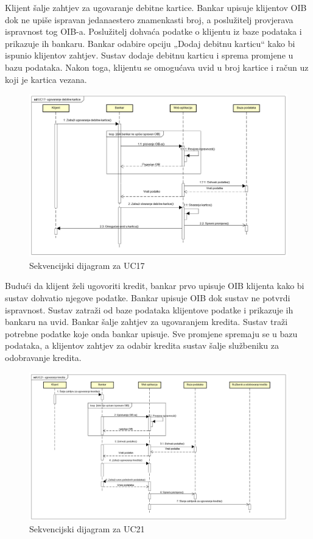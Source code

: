 			Klijent šalje zahtjev za ugovaranje debitne kartice. Bankar upisuje klijentov OIB dok ne upiše ispravan jedanaestero znamenkasti broj, a poslužitelj provjerava ispravnost tog OIB-a. Poslužitelj dohvaća podatke o klijentu iz baze podataka i prikazuje ih bankaru. Bankar odabire opciju „Dodaj debitnu karticu“ kako bi ispunio klijentov zahtjev. Sustav dodaje debitnu karticu i sprema promjene u bazu podataka. Nakon toga, klijentu se omogućava uvid u broj kartice i račun uz koji je kartica vezana.
			\eject
			
			\begin{figure}[H]
				\includegraphics[scale=0.50]{slike/UC17- ugovaranje debitne kartice1.PNG}
				\centering
				\caption{Sekvencijski dijagram za UC17}
				\label{fig:uc17}
			\end{figure}
			\eject
			
			
			
			Budući da klijent želi ugovoriti kredit, bankar prvo upisuje OIB klijenta kako bi sustav dohvatio njegove podatke. Bankar upisuje OIB dok sustav ne potvrdi ispravnost. Sustav zatraži od baze podataka klijentove podatke i prikazuje ih bankaru na uvid. Bankar šalje zahtjev za ugovaranjem kredita. Sustav traži potrebne podatke koje onda bankar upisuje. Sve promjene spremaju se u bazu podataka, a klijentov zahtjev za odabir kredita sustav šalje službeniku za odobravanje kredita.
			\eject
			
			\begin{figure}[H]
				\includegraphics[scale=0.43]{slike/UC21- ugovaranje kredita.PNG}
				\centering
				\caption{Sekvencijski dijagram za UC21}
				\label{fig:uc21}
			\end{figure}
			\eject
			
